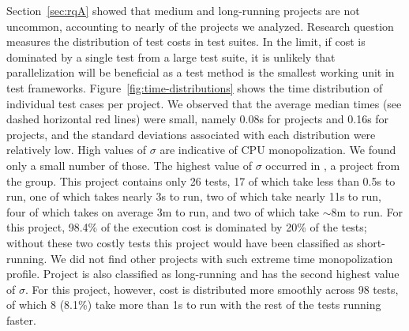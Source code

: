 \documentclass[10pt,journal,compsoc]{IEEEtran}
\begin{document}
Section~\ref{sec:rqA} showed that medium and long-running projects are
not uncommon, accounting to nearly \percentMedLongRunning{} of the
\numSubjs{} projects we analyzed.  Research question \numRQFeasibilityTwo{}
measures the distribution of test costs in test suites.  In
the limit, if cost is dominated by a single test from a large test
suite, it is unlikely that parallelization will be beneficial as a
test method is the smallest working unit in test frameworks.
Figure~\ref{fig:time-distributions} shows the time distribution of
individual test cases per project.
We observed that the average median times (see dashed horizontal red
lines) were small, namely 0.08s
for \medg{} projects and 0.16s for \longg{} projects, and the standard deviations associated with each distribution were
relatively low. High values of
$\sigma$ are indicative of CPU monopolization. We found only a small number
of those. The highest value of $\sigma$ occurred in
, a project from the \longg{} group.
This project contains only 26 tests, 17 of which take less than 0.5s
to run, one of which takes nearly 3s to run, two of which take nearly
11s to run, four of which takes on average 3m to run, and two of which
take $\sim$8m to run.
For this project, 98.4\% of the execution cost is dominated by 20\% of
the tests; without these two costly tests this project would have been
classified as short-running.
We did not find other projects with such extreme time monopolization
profile.
Project  is also classified as
long-running and has the second highest value of $\sigma$.
For this project, however, cost is distributed more smoothly across 98
tests, of which 8 (8.1\%) take more than 1s to run with the rest of
the tests running faster.
\end{document}
